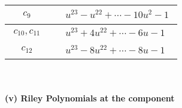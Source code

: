 \documentclass[1p]{elsarticle_modified}
\theoremstyle{definition}
\begin{document}
\begin{tabular}{m{50pt}|m{274pt}}
\hline $$\begin{aligned}c_{9}\end{aligned}$$&$\begin{aligned}
&u^{23}- u^{22}+\cdots-10 u^2-1
\end{aligned}$\\
\hline $$\begin{aligned}c_{10},c_{11}\end{aligned}$$&$\begin{aligned}
&u^{23}+4 u^{22}+\cdots-6 u-1
\end{aligned}$\\
\hline $$\begin{aligned}c_{12}\end{aligned}$$&$\begin{aligned}
&u^{23}-8 u^{22}+\cdots-8 u-1
\end{aligned}$\\
\hline
\end{tabular}\\~\\
\newpage\renewcommand{\arraystretch}{1}
\flushleft \textbf{(v) Riley Polynomials at the component}\newline \\
\end{document}
